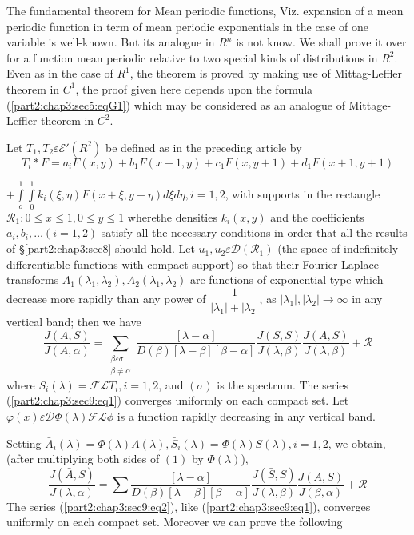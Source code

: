 The fundamental theorem for Mean periodic functions, Viz. expansion of
a mean periodic function in term of mean periodic exponentials in the
case of one variable is well-known. But its analogue in $R^n$ is not
know. We shall prove it over for a function mean periodic relative to
two special kinds of distributions in $R^2$. Even as in the case of
$R^1$, the theorem is proved by making use of Mittag-Leffler theorem
in $C^1$, the proof given here depends upon the formula
(\ref{part2:chap3:sec5:eqG1}) which may be considered as an analogue of
Mittage-Leffler theorem in $C^2$. 

Let $T_1,T_2 \varepsilon  \mathscr{E}' (R^2)$ be defined as in the
preceding article by 
$$
T_i *F =a_iF(x,y)+b_1 F(x+1,y)+c_1F(x,y+1)+d_1F(x+1,y+1)
$$

$+ \int\limits_o^1 \int\limits^1_0 k_i (\xi, \eta)F(x+ \xi,y+ \eta)d \xi d \eta,
i=1,2$, with supports in the rectangle $\mathscr{R}_1: 0 \leq x \leq
1,0 \leq y \leq 1$ where\pageoriginale the densities $k_i(x,y)$ and the coefficients
$a_i,b_i, \ldots (i=1,2)$ satisfy all the necessary conditions in order
that all the results of \S \ref{part2:chap3:sec8} should hold. Let $u_1,u_2 \varepsilon 
\mathscr{D}(\mathscr{R}_1)$ (the space of indefinitely differentiable
functions with compact support) so that their Fourier-Laplace
transforms $A_1(\lambda_1, \lambda_2),A_2(\lambda_1, \lambda_2)$ are
functions of exponential type which decrease more rapidly than any
power of $\dfrac{1}{|\lambda_1|+|\lambda_2|}$, as
$|\lambda_1|,|\lambda_2| \to \infty $ in any vertical band; then we
have 
\begin{equation}
  \frac{J(A,S)}{J(A,\alpha)}=\sum _{\substack {\beta  \varepsilon  \sigma
      \\{\beta \neq \alpha}}}\frac{[\lambda-
      \alpha]}{D(\beta)[\lambda- \beta][\beta-\alpha]}
  \frac{J(S,S)}{J(\lambda, \beta)}\frac{J(A,S)}{J(\lambda,
    \beta)}+\mathscr{R} \tag{1}\label{part2:chap3:sec9:eq1} 
\end{equation}
where $S_i(\lambda)=\mathscr{F}\mathscr{L}T_i,i=1,2$, and $(\sigma)$
is the spectrum. The series (\ref{part2:chap3:sec9:eq1}) converges uniformly on each compact
set. Let $\varphi (x) \varepsilon  \mathscr{D} \Phi (\lambda)
\mathscr{F} \mathscr{L}\phi$  is a function rapidly decreasing in any
vertical band. 

Setting $\bar{A}_i(\lambda)=\Phi (\lambda)A(\lambda),\bar{S}_i
(\lambda)=\Phi (\lambda)S(\lambda),i=1,2$, we obtain, (after
multiplying both sides of $(1)$ by $\Phi(\lambda)$), 
\begin{equation}
  \frac{J(\bar{A},S)}{J(\lambda,\alpha)}= \sum \frac{[\lambda-
      \alpha]}{D(\beta)[\lambda- \beta][\beta-\alpha]}
  \frac{J(\bar{S},S)}{J(\lambda,
    \beta)}\frac{J(A,S)}{J(\beta,\alpha)} +\bar{\mathscr{R}}
  \tag{2}\label{part2:chap3:sec9:eq2} 
\end{equation}
The series (\ref{part2:chap3:sec9:eq2}), like (\ref{part2:chap3:sec9:eq1}), converges uniformly on each compact
set. Moreover we can prove the following 

